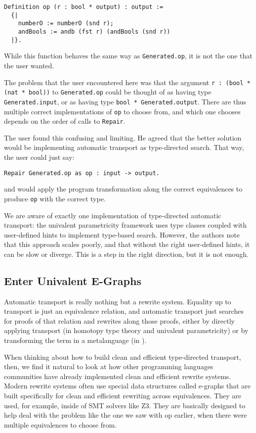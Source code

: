 \begin{lstlisting}
Definition op (r : bool * output) : output := 
  {|
    numberO := numberO (snd r);
    andBools := andb (fst r) (andBools (snd r))
  |}.
\end{lstlisting}
While this function behaves the same way as \lstinline{Generated.op}, it is not the one that the user wanted.

The problem that the user encountered here was that the argument \lstinline{r : (bool * (nat * bool))} to
\lstinline{Generated.op} could be thought of as having type \lstinline{Generated.input}, or as having type
\lstinline{bool * Generated.output}.
There are thus multiple correct implementations of \lstinline{op} to choose from,
and which one \toolname chooses depends on the order of calls to \lstinline{Repair}.

The user found this confusing and limiting.
He agreed that the better solution would be implementing automatic transport as type-directed search.
That way, the user could just say:

\begin{lstlisting}
Repair Generated.op as op : input -> output.
\end{lstlisting}
and \toolname would apply the program transformation along the correct equivalences
to produce \lstinline{op} with the correct type.

We are aware of exactly one implementation of type-directed automatic transport:
the univalent parametricity framework uses type classes coupled with user-defined hints to implement type-based search.
However, the authors note that this approach scales poorly, and that without the right user-defined
hints, it can be slow or diverge.
This is a step in the right direction, but it is not enough.

\subsection{Enter Univalent E-Graphs}
\label{sec:key}

Automatic transport is really nothing but a rewrite system.
Equality up to transport is just an equivalence relation, and automatic transport just searches for proofs of that relation and rewrites along those proofs, either by directly applying transport (in homotopy type theory and univalent parametricity) or by transforming the term in a metalanguage (in \toolname).

When thinking about how to build clean and efficient type-directed transport, then, we find it natural to look
at how other programming languages communities have already implemented clean and efficient rewrite systems.
Modern rewrite systems often use special data structures called e-graphs that are built specifically
for clean and efficient rewriting across equivalences.
They are used, for example, inside of SMT solvers like Z3.
They are basically designed to help deal with the problem like the one we saw with op earlier, when there were multiple equivalences to 
choose from.

